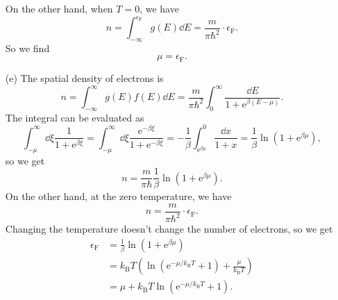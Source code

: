 \documentclass[hyperref, a4paper]{article}
\newcommand*{\ee}{\mathrm{e}}
\begin{document}
\begin{itemize}
On the other hand, when $T = 0$, we have 
\begin{equation}
    n = \int_{-\infty}^{\epsilon_{\text{F}}} g(E) \dd{E} = \frac{m}{\pi \hbar^2} \cdot \epsilon_{\text{F}}.
\end{equation}
So we find 
\begin{equation}
    \mu = \epsilon_{\text{F}}.
    \label{eq:wrong-mu}
\end{equation}

\item[(e)] The spatial density of electrons is  
\[
    n = \int_{-\infty}^\infty g(E) f(E) \dd{E} 
    = \frac{m}{\pi \hbar^2} \int_{0}^\infty \frac{\dd{E}}{1 + \ee^{\beta (E - \mu)}}.
\]
The integral can be evaluated as 
\[
    \int_{- \mu}^\infty \dd{\xi} \frac{1}{1 + \ee^{\beta \xi}} = 
    \int_{- \mu}^\infty \dd{\xi} \frac{\ee^{- \beta \xi}}{1 + \ee^{- \beta \xi}} =
    - \frac{1}{\beta} \int_{\ee^{\beta \mu}}^0 \frac{\dd{x}}{1 + x} 
    = \frac{1}{\beta} \ln (1 + \ee^{\beta \mu}),
\]
so we get 
\[
    n = \frac{m}{\pi \hbar} \frac{1}{\beta} \ln (1 + \ee^{\beta \mu}).
\]
On the other hand, at the zero temperature, we have 
\[
    n = \frac{m}{\pi \hbar^2} \cdot \epsilon_{\text{F}}.
\]
Changing the temperature doesn't change the number of electrons, so we get 
\begin{equation}
    \begin{aligned}
        \epsilon_{\text{F}} &= \frac{1}{\beta} \ln (1 + \ee^{\beta \mu}) \\
        &= k_{\text{B}} T \left(
            \ln (\ee^{- \mu / k_{\text{B}} T} + 1) + \frac{\mu}{k_{\text{B}} T}
        \right) \\
        &= \mu + k_{\text{B}} T \ln (\ee^{- \mu / k_{\text{B}} T} + 1).
    \end{aligned}
    \label{eq:correct-mu}
\end{equation}


\end{itemize}
\end{document}
